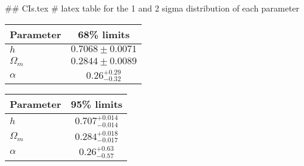 ## CIs.tex
# latex table for the 1 and 2 sigma distribution of each parameter

\begin{tabular} { l  c}
 Parameter &  68\% limits\\
\hline
{\boldmath$h              $} & $0.7068\pm 0.0071          $\\
{\boldmath$\Omega_m       $} & $0.2844\pm 0.0089          $\\
{\boldmath$\alpha         $} & $0.26^{+0.29}_{-0.32}      $\\
\hline
\end{tabular}

\begin{tabular} { l  c}
 Parameter &  95\% limits\\
\hline
{\boldmath$h              $} & $0.707^{+0.014}_{-0.014}   $\\
{\boldmath$\Omega_m       $} & $0.284^{+0.018}_{-0.017}   $\\
{\boldmath$\alpha         $} & $0.26^{+0.63}_{-0.57}      $\\
\hline
\end{tabular}
